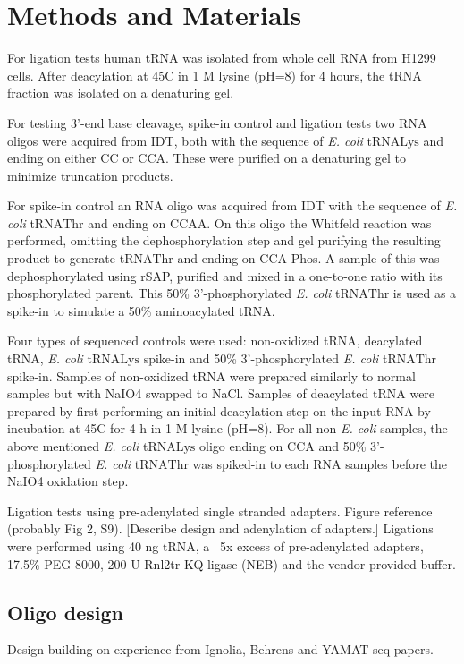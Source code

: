 \documentclass[9pt,lineno]{elife}
\begin{document}
\section{Methods and Materials}


For ligation tests human tRNA was isolated from whole cell RNA from H1299 cells.
After deacylation at 45C in 1 M lysine (pH=8) for 4 hours, the tRNA fraction was isolated on a denaturing gel.

For testing 3'-end base cleavage, spike-in control and ligation tests two RNA oligos were acquired from IDT, both with the sequence of \textit{E. coli} tRNA$\text{Lys}$ and ending on either CC or CCA.
These were purified on a denaturing gel to minimize truncation products.

For spike-in control an RNA oligo was acquired from IDT with the sequence of \textit{E. coli} tRNA$\text{Thr}$ and ending on CCAA.
On this oligo the Whitfeld reaction was performed, omitting the dephosphorylation step and gel purifying the resulting product to generate tRNA$\text{Thr}$ and ending on CCA-Phos.
A sample of this was dephosphorylated using rSAP, purified and mixed in a one-to-one ratio with its phosphorylated parent.
This 50\% 3'-phosphorylated \textit{E. coli} tRNA$\text{Thr}$ is used as a spike-in to simulate a 50\% aminoacylated tRNA.




Four types of sequenced controls were used: non-oxidized tRNA, deacylated tRNA, \textit{E. coli} tRNA$\text{Lys}$ spike-in and 50\% 3'-phosphorylated \textit{E. coli} tRNA$\text{Thr}$ spike-in.
Samples of non-oxidized tRNA were prepared similarly to normal samples but with NaIO4 swapped to NaCl.
Samples of deacylated tRNA were prepared by first performing an initial deacylation step on the input RNA by incubation at 45C for 4 h in 1 M lysine (pH=8).
For all non-\textit{E. coli} samples, the above mentioned \textit{E. coli} tRNA$\text{Lys}$ oligo ending on CCA and 50\% 3'-phosphorylated \textit{E. coli} tRNA$\text{Thr}$ was spiked-in to each RNA samples before the NaIO4 oxidation step.


Ligation tests using pre-adenylated single stranded adapters.
Figure reference (probably Fig 2, S9).
[Describe design and adenylation of adapters.]
Ligations were performed using 40 ng tRNA, a ~5x excess of pre-adenylated adapters, 17.5\% PEG-8000, 200 U Rnl2tr KQ ligase (NEB) and the vendor provided buffer.





\subsection*{Oligo design}
Design building on experience from Ignolia, Behrens and YAMAT-seq papers.
\end{document}
